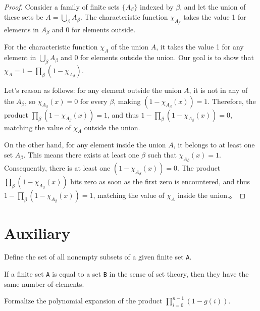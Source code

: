 \begin{proof}
    \leanok

Consider a family of finite sets \(\{A_\beta\}\) indexed by \(\beta\), and let the union of these sets be \(A = \bigcup_\beta A_\beta\). The characteristic function \(\chi_{A_\beta}\) takes the value 1 for elements in \(A_\beta\) and 0 for elements outside.

For the characteristic function \(\chi_A\) of the union \(A\), it takes the value 1 for any element in \(\bigcup_\beta A_\beta\) and 0 for elements outside the union. Our goal is to show that \(\chi_A = 1 - \prod_\beta (1 - \chi_{A_\beta})\).

Let's reason as follows: for any element outside the union \(A\), it is not in any of the \(A_\beta\), so \(\chi_{A_\beta}(x) = 0\) for every \(\beta\), making \((1 - \chi_{A_\beta}(x)) = 1\). Therefore, the product \(\prod_\beta (1 - \chi_{A_\beta}(x)) = 1\), and thus \(1 - \prod_\beta (1 - \chi_{A_\beta}(x)) = 0\), matching the value of \(\chi_A\) outside the union.

On the other hand, for any element inside the union \(A\), it belongs to at least one set \(A_\beta\). This means there exists at least one \(\beta\) such that \(\chi_{A_\beta}(x) = 1\). Consequently, there is at least one \((1 - \chi_{A_\beta}(x)) = 0\). The product \(\prod_\beta (1 - \chi_{A_\beta}(x))\) hits zero as soon as the first zero is encountered, and thus \(1 - \prod_\beta (1 - \chi_{A_\beta}(x)) = 1\), matching the value of \(\chi_A\) inside the union.。

\end{proof}

\section{Auxiliary}

\begin{definition}\label{Finset.powerset₀}
  \leanok
  Define the set of all nonempty subsets of a given finite set \verb|A|.
\end{definition}

\begin{lemma}\label{card_eq}
  If a finite set \verb|A| is equal to a set \verb|B| in the sense of set theory, then they have the same number of elements.
\end{lemma}

\begin{lemma}\label{mul_expand₃}
  Formalize the polynomial expansion of the product \(\prod_{i=0}^{n-1} (1 - g(i))\).
\end{lemma}

